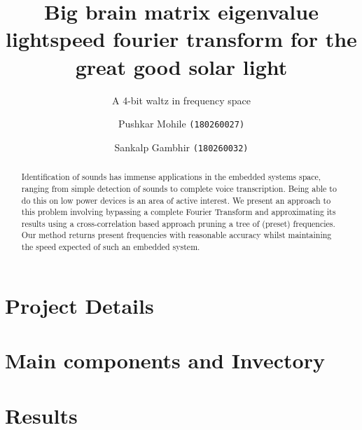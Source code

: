 \documentclass{llncs}
\title{Big brain matrix eigenvalue lightspeed fourier transform for the great good solar light}
\subtitle{A 4-bit waltz in frequency space}
\author{Pushkar Mohile \texttt{(180260027)} \and Sankalp Gambhir \texttt{(180260032)}}
\institute{Indian Institute of Technology, Bombay}
\begin{document}
    \maketitle

    \begin{abstract}
    Identification of sounds has immense applications in the embedded systems
    space, ranging from simple detection of sounds to complete voice
    transcription. Being able to do this on low power devices is an area of
    active interest. We present an approach to this problem involving bypassing
    a complete Fourier Transform and approximating its results using a
    cross-correlation based approach pruning a tree of (preset) frequencies. Our
    method returns present frequencies with reasonable accuracy whilst
    maintaining the speed expected of such an embedded system.
    \end{abstract}

    \section{Project Details}
        

    \section{Main components and Invectory}
        

    \section{Results}
        

    \newpage
        

    
    
\end{document}
